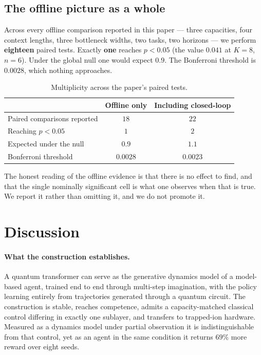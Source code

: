 \documentclass[11pt,onecolumn]{article}
\begin{document}
\subsection{The offline picture as a whole}\label{sec:multiplicity}
Across every offline comparison reported in this paper --- three
capacities, four context lengths, three bottleneck widths, two tasks,
two horizons --- we perform \textbf{eighteen} paired tests. Exactly
\textbf{one} reaches $p < 0.05$ (the value $0.041$ at $K = 8$,
$n = 6$). Under the global null one would expect $0.9$. The Bonferroni
threshold is $0.0028$, which nothing approaches.

\begin{table}[htb]\centering\small
\caption{Multiplicity across the paper's paired tests.}
\begin{tabular}{lcc}
\toprule
& Offline only & Including closed-loop \\
\midrule
Paired comparisons reported & $18$ & $22$ \\
Reaching $p < 0.05$         & $1$  & $2$ \\
Expected under the null     & $0.9$ & $1.1$ \\
Bonferroni threshold        & $0.0028$ & $0.0023$ \\
\bottomrule
\end{tabular}
\end{table}

The honest reading of the offline evidence is that there is no effect to
find, and that the single nominally significant cell is what one
observes when that is true. We report it rather than omitting it, and we
do not promote it.

\section{Discussion}
\paragraph{What the construction establishes.}
A quantum transformer can serve as the generative dynamics model of a
model-based agent, trained end to end through multi-step imagination,
with the policy learning entirely from trajectories generated through a
quantum circuit. The construction is stable, reaches competence, admits
a capacity-matched classical control differing in exactly one sublayer,
and transfers to trapped-ion hardware. Measured as a dynamics model
under partial observation it is indistinguishable from that control,
yet as an agent in the same condition it returns $69\%$ more reward
over eight seeds.
\end{document}
